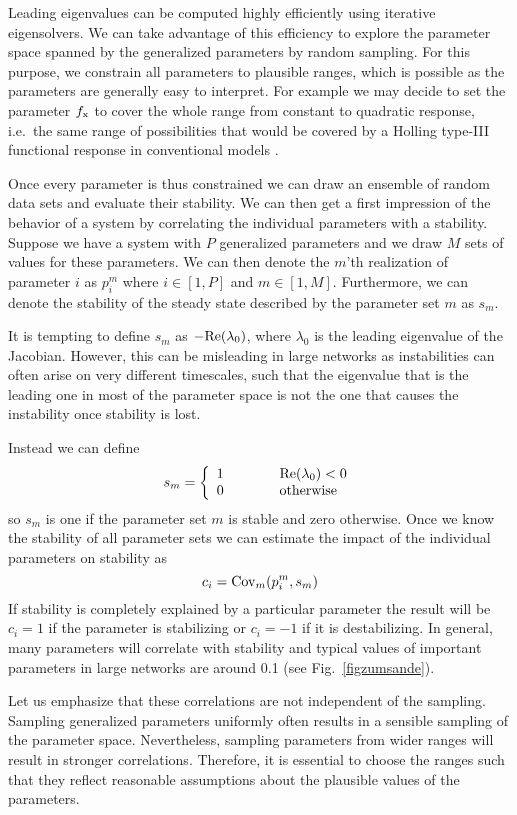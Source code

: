 \documentclass{article}
\newcommand{\eq}[1]{\begin{equation}#1\end{equation}}
\begin{document}
Leading eigenvalues can be computed highly efficiently using iterative eigensolvers. We can take advantage of this efficiency to explore the parameter space spanned by the generalized parameters by random sampling. For this purpose, we constrain all parameters to plausible ranges, which is possible as the parameters are generally easy to interpret. For example we may decide to set the parameter $f_{\rm x}$ to cover the whole range from constant to quadratic response, i.e.~the same range of possibilities that would be covered by a Holling type-III functional response in conventional models \citep{holling1959some}. 

Once every parameter is thus constrained we can draw an ensemble of random data sets and evaluate their stability. We can then get a first impression of the behavior of a system by correlating the individual parameters with a stability. Suppose we have a system with $P$ generalized parameters and we draw $M$ sets of values for these parameters. We can then denote the $m$'th realization of parameter $i$ as $p_i^m$ where $i\in [1,P]$ and $m \in [1,M]$. Furthermore, we can denote the stability of the steady state described by the parameter set $m$ as $s_m$. 

It is tempting to define $s_m$ as $-{\rm Re}(\lambda_0)$, where $\lambda_0$ is the leading eigenvalue of the Jacobian. However, this can be misleading in large networks as instabilities can often arise on very different timescales, such that the eigenvalue that is the leading one in most of the parameter space is not the one that causes the instability once stability is lost. 

Instead we can define
\eq{
s_m = \left\{ \begin{array}{l l} 
  1 & \quad\quad\quad {\rm Re}(\lambda_0) < 0 \\
  0 & \quad\quad\quad \mbox{otherwise} 
  \end{array}\right.
}
so $s_m$ is one if the parameter set $m$ is stable and zero otherwise. Once we know the stability of all parameter sets we can estimate the impact of the individual parameters on stability as 
\eq{
c_i = {\rm Cov}_m(p_i^m,s_m)
}
If stability is completely explained by a particular parameter the result will be $c_i=1$ if the parameter is stabilizing or $c_i=-1$ if it is destabilizing. In general, many parameters will correlate with stability and typical values of important parameters in large networks are around 0.1 (see Fig.~\ref{figzumsande}). 

Let us emphasize that these correlations are not independent of the sampling. Sampling generalized parameters uniformly often results in a sensible sampling of the parameter space. Nevertheless, sampling parameters from wider ranges will result in stronger correlations. Therefore, it is essential to choose the ranges such that they reflect reasonable assumptions about the plausible values of the parameters.
\end{document}
